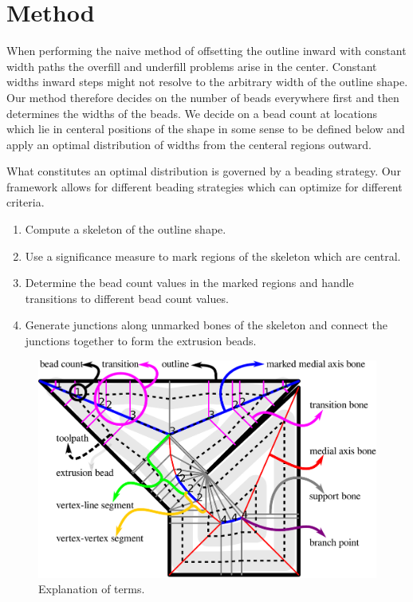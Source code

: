 \section{Method}
When performing the naive method of offsetting the outline inward with constant width paths the overfill and underfill problems arise in the center.
Constant widths inward steps might not resolve to the arbitrary width of the outline shape.
Our method therefore decides on the number of beads everywhere first and then determines the widths of the beads.
We decide on a bead count at locations which lie in centeral positions of the shape in some sense to be defined below and apply an optimal distribution of widths from the centeral regions outward.

What constitutes an optimal distribution is governed by a beading strategy.
Our framework allows for different beading strategies which can optimize for different criteria.

\begin{enumerate}
\item Compute a skeleton of the outline shape.
\item Use a significance measure to mark regions of the skeleton which are central.
\item Determine the bead count values in the marked regions and handle transitions to different bead count values.
\item Generate junctions along unmarked bones of the skeleton and connect the junctions together to form the extrusion beads.
\end{enumerate}


\begin{figure}
\includegraphics[width=\columnwidth]{sources/method/terminology.pdf}
\caption{Explanation of terms.}
\label{legend}
\end{figure}


















